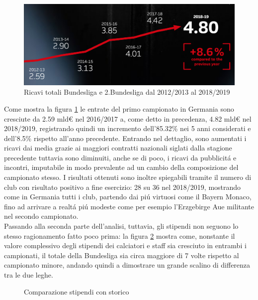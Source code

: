 \documentclass[
    corpo=12pt,
    oneside,
    evenboxes,
    tipotesi=triennale,
    stile=classica,
    oldstyle,
    autoretitolo,
    greek,
]{toptesi}
\begin{document}
\begin{interlinea}{1.5}
\begin{figure}
    \centering
    \includegraphics[scale=.5]{img/ris_germania.png}
    \caption{Ricavi totali Bundesliga e 2.Bundesliga dal 2012/2013 al 2018/2019}
    \label{ris_germania}
\end{figure}
Come mostra la figura \ref{ris_germania} le entrate del primo campionato in Germania sono cresciute da 2.59 mld€ nel 2016/2017
a, come detto in precedenza, 4.82 mld€ nel 2018/2019, registrando quindi un incremento dell'85.32\% nei 5 anni considerati e dell'8.5\% rispetto
all'anno precedente. Entrando nel dettaglio, sono aumentati i ricavi dai media grazie ai maggiori contratti nazionali siglati dalla stagione precedente tuttavia sono diminuiti, anche se di poco,
i ricavi da pubblicit\'a e incontri, imputabile in modo prevalente ad un cambio della composizione del campionato stesso.
I risultati ottenuti sono inoltre spiegabili tramite il numero di club con risultato positivo a fine esercizio: 28 su 36 nel 2018/2019, mostrando come
in Germania tutti i club, partendo dai pi\'u virtuosi come il Bayern Monaco, fino ad arrivare a realt\'a pi\'u modeste come per esempio
l'Erzgebirge Aue militante nel secondo campionato.\\
Passando alla seconda parte dell'analisi, tuttavia, gli stipendi non seguono lo stesso ragionamento fatto poco prima: la figura 
\ref{comparazione_stipendi_germania} mostra come, nonstante il valore complessivo degli stipendi dei calciatori e staff sia cresciuto in entrambi
i campionati, il totale della Bundesliga sia circa maggiore di 7 volte rispetto al campionato minore, andando quindi a dimostrare
un grande scalino di differenza tra le due leghe.
\begin{figure}
    \centering
     \quad
    \caption{Comparazione stipendi con storico}
    \label{comparazione_stipendi_germania}  
\end{figure}


\end{interlinea}
\end{document}
